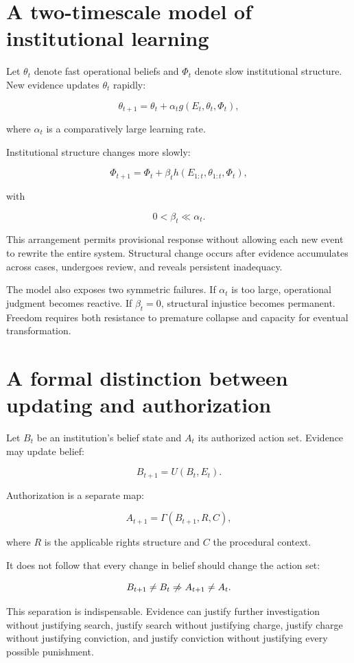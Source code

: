 \section{A two-timescale model of institutional learning}
\label{sec:a55}

Let \(\theta_t\) denote fast operational beliefs and \(\Phi_t\) denote slow institutional structure. New evidence updates \(\theta_t\) rapidly:

\[
\theta_{t+1}
=
\theta_t
+
\alpha_t
g(E_t,\theta_t,\Phi_t),
\]

where \(\alpha_t\) is a comparatively large learning rate.

Institutional structure changes more slowly:

\[
\Phi_{t+1}
=
\Phi_t
+
\beta_t
h(E_{1:t},\theta_{1:t},\Phi_t),
\]

with

\[
0<\beta_t\ll\alpha_t.
\]

This arrangement permits provisional response without allowing each new event to rewrite the entire system. Structural change occurs after evidence accumulates across cases, undergoes review, and reveals persistent inadequacy.

The model also exposes two symmetric failures. If \(\alpha_t\) is too large, operational judgment becomes reactive. If \(\beta_t=0\), structural injustice becomes permanent. Freedom requires both resistance to premature collapse and capacity for eventual transformation.

\section{A formal distinction between updating and authorization}
\label{sec:a56}

Let \(B_t\) be an institution's belief state and \(A_t\) its authorized action set. Evidence may update belief:

\[
B_{t+1}=U(B_t,E_t).
\]

Authorization is a separate map:

\[
A_{t+1}
=
\Gamma(B_{t+1},R,C),
\]

where \(R\) is the applicable rights structure and \(C\) the procedural context.

It does not follow that every change in belief should change the action set:

\[
B_{t+1}\neq B_t
\centernot\Rightarrow
A_{t+1}\neq A_t.
\]

This separation is indispensable. Evidence can justify further investigation without justifying search, justify search without justifying charge, justify charge without justifying conviction, and justify conviction without justifying every possible punishment.


